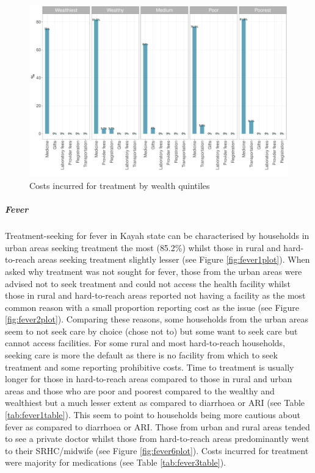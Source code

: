 \documentclass[12pt,a4paper]{article}
\let\oldsubparagraph\subparagraph
\renewcommand{\subparagraph}[1]{\oldsubparagraph{#1}\mbox{}}
\begin{document}
\begin{figure}[H]

{\centering \includegraphics{kayahReport_files/figure-latex/ari8plot-1} 

}

\caption{Costs incurred for treatment by wealth quintiles}\label{fig:ari8plot}
\end{figure}

\hypertarget{fever}{%
\subparagraph{Fever}\label{fever}}

Treatment-seeking for fever in Kayah state can be characterised by households in urban areas seeking treatment the most (85.2\%) whilst those in rural and hard-to-reach areas seeking treatment slightly lesser (see Figure \ref{fig:fever1plot}). When asked why treatment was not sought for fever, those from the urban areas were advised not to seek treatment and could not access the health facility whilst those in rural and hard-to-reach areas reported not having a facility as the most common reason with a small proportion reporting cost as the issue (see Figure \ref{fig:fever2plot}). Comparing these reasons, some households from the urban areas seem to not seek care by choice (chose not to) but some want to seek care but cannot access facilities. For some rural and most hard-to-reach households, seeking care is more the default as there is no facility from which to seek treatment and some reporting prohibitive costs. Time to treatment is usually longer for those in hard-to-reach areas compared to those in rural and urban areas and those who are poor and poorest compared to the wealthy and wealthiest but a much lesser extent as compared to diarrhoea or ARI (see Table \ref{tab:fever1table}). This seem to point to households being more cautious about fever as compared to diarrhoea or ARI. Those from urban and rural areas tended to see a private doctor whilst those from hard-to-reach areas predominantly went to their SRHC/midwife (see Figure \ref{fig:fever6plot}). Costs incurred for treatment were majority for medications (see Table \ref{tab:fever3table}).
\end{document}
